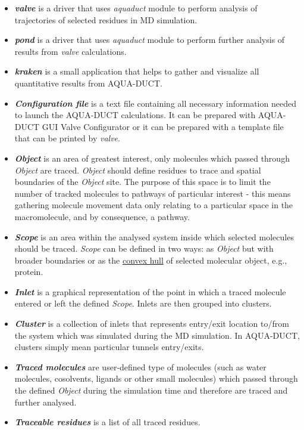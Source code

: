 \documentclass[9pt,tutorial]{livecoms}
\begin{document}
\begin{itemize}
\item \textbf{\textit{valve}} is a driver that uses \textit{aquaduct} module to perform analysis of trajectories of selected residues in MD simulation.
\item \textbf{\textit{pond}} is a driver that uses \textit{aquaduct} module to perform further analysis of results from \textit{valve} calculations.
\item \textbf{\textit{kraken}} is a small application that helps to gather and visualize all quantitative results from AQUA-DUCT.
\item \textbf{\textit{Configuration file}} is a text file containing all necessary information needed to launch the AQUA-DUCT calculations. It can be prepared with AQUA-DUCT GUI Valve Configurator or it can be prepared with a template file that can be printed by \textit{valve}.
\item \textbf{\textit{Object}} is an area of greatest interest, only molecules which passed through \textit{Object} are traced. \textit{Object} should define residues to trace and spatial boundaries of the \textit{Object} site. The purpose of this space is to limit the number of tracked molecules to pathways of particular interest - this means gathering molecule movement data only relating to a particular space in the macromolecule, and by consequence, a pathway.
\item \textbf{\textit{Scope}} is an area within the analysed system inside which selected molecules should be traced. \textit{Scope} can be defined in two ways: as \textit{Object} but with broader boundaries or as the \href{https://tunneling-group.github.io/aqua-duct/valve/valve_manual.html?highlight=convex\%20hull#convex-hulls-of-macromolecule-atoms}{convex hull} of selected molecular object, e.g., protein.
\item \textbf{\textit{Inlet}} is a graphical representation of the point in which a traced molecule entered or left the defined \textit{Scope}. Inlets are then grouped into clusters.
\item \textbf{\textit{Cluster}} is a collection of inlets that represents entry/exit location to/from the system which was simulated during the MD simulation. In AQUA-DUCT, clusters simply mean particular tunnels entry/exits.
\item \textbf{\textit{Traced molecules}} are user-defined type of molecules (such as water molecules, cosolvents, ligands or other small molecules) which passed through the defined \textit{Object} during the simulation time and therefore are traced and further analysed.
\item \textbf{\textit{Traceable residues}} is a list of all traced residues.


\end{itemize}
\end{document}
